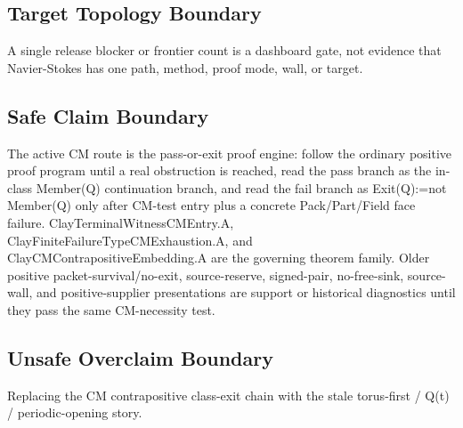 \subsection{Target Topology Boundary}
A single release blocker or frontier count is a dashboard gate, not evidence that Navier-Stokes has one path, method, proof mode, wall, or target.

\subsection{Safe Claim Boundary}
The active CM route is the pass-or-exit proof engine: follow the ordinary positive proof program until a real obstruction is reached, read the pass branch as the in-class Member(Q) continuation branch, and read the fail branch as Exit(Q):=not Member(Q) only after CM-test entry plus a concrete Pack/Part/Field face failure. ClayTerminalWitnessCMEntry.A, ClayFiniteFailureTypeCMExhaustion.A, and ClayCMContrapositiveEmbedding.A are the governing theorem family. Older positive packet-survival/no-exit, source-reserve, signed-pair, no-free-sink, source-wall, and positive-supplier presentations are support or historical diagnostics until they pass the same CM-necessity test.

\subsection{Unsafe Overclaim Boundary}
Replacing the CM contrapositive class-exit chain with the stale torus-first / Q(t) / periodic-opening story.

